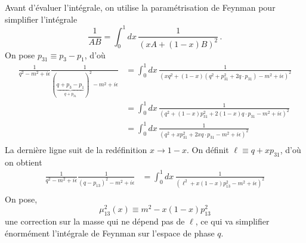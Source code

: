 \documentclass{article}
\numberwithin{equation}{section}
\theoremstyle{solution}
\begin{document}
Avant d'évaluer l'intégrale, on utilise la paramétrisation de Feynman pour simplifier l'intégrale
\begin{equation}
        \frac{1}{AB} = \int_0^{1}dx\, \frac{1}{(xA + (1 - x)B)^{2}}\, .
\end{equation} 
On pose $p_{31} \equiv p_3 - p_1$, d'où
\begin{align*}
        \frac{1}{q^{2} - m^{2} + i \epsilon} \frac{1}{(\underbrace{q + p_3 - p_1}_{q + p_{31}})^{2} - m^{2} + i \epsilon} 
        &= \int_0^{1}dx\, \frac{1}{(xq^2 + (1 - x)(q^{2} + p_{31}^{2} + 2 q\cdot p_{31}) - m^{2} + i \epsilon)^2} \\
        &= \int_0^{1}dx\, \frac{1}{(q^{2} + (1 - x)p_{31}^{2} + 2(1 - x) q\cdot p_{31} - m^{2} + i \epsilon)^2} \\
        &= \int_0^{1}dx\, \frac{1}{(q^{2} + xp_{31}^{2} + 2x q\cdot p_{31} - m^{2} + i \epsilon)^2} \\
\end{align*} 
La dernière ligne suit de la redéfinition $x \rightarrow 1 - x$.
On définit $\ell \equiv q + xp_{31}$, d'où on obtient
\begin{align*}
        \frac{1}{q^{2} - m^{2} + i \epsilon} \frac{1}{(q - p_{13})^{2} - m^{2} + i \epsilon} 
        &= \int_0^{1}dx\, \frac{1}{(\ell^{2} + x(1 - x)p_{13}^{2} - m^{2} + i \epsilon)^2} \\
\end{align*}
On pose,
\begin{equation}
        \mu_{13}^{2}(x) \equiv m^{2} - x(1 - x)p_{13}^{2}
\end{equation} 
une correction sur la masse qui ne dépend pas de $\ell$, ce qui va simplifier énormément l'intégrale de Feynman sur l'espace de phase $q$.
\end{document}
